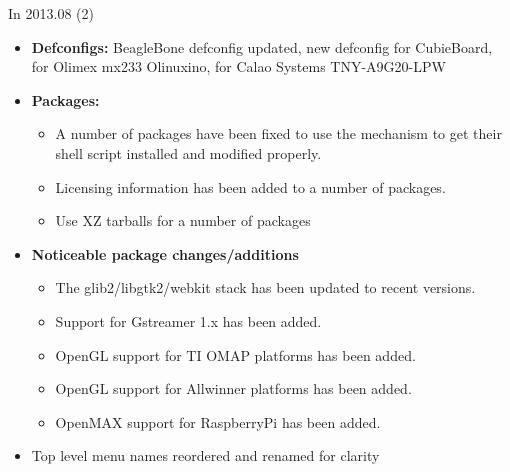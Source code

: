 \begin{frame}{In 2013.08 (2)}
  \begin{itemize}
  \item {\bf Defconfigs:} BeagleBone defconfig updated, new defconfig
    for CubieBoard, for Olimex mx233 Olinuxino, for Calao Systems
    TNY-A9G20-LPW
  \item {\bf Packages:}
    \begin{itemize}
    \item A number of packages have been fixed to use the
       mechanism to get their
       shell script installed and modified
      properly.
    \item Licensing information has been added to a number of
      packages.
    \item Use XZ tarballs for a number of packages
    \end{itemize}
  \item {\bf Noticeable package changes/additions}
    \begin{itemize}
    \item The glib2/libgtk2/webkit stack has been updated to recent versions.
    \item Support for Gstreamer 1.x has been added.
    \item OpenGL support for TI OMAP platforms has been added.
    \item OpenGL support for Allwinner platforms has been added.
    \item OpenMAX support for RaspberryPi has been added.
    \end{itemize}
  \item Top level menu names reordered and renamed for clarity
  \end{itemize}
\end{frame}

